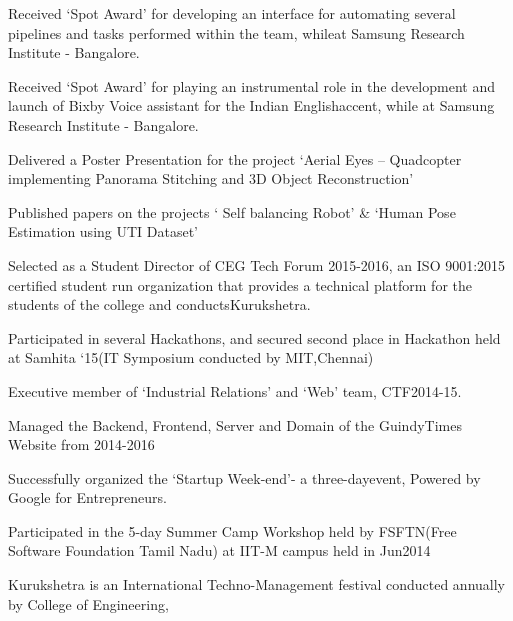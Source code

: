 
\begin{cventries}
      \begin{cvitems} %
        \item{Received ‘Spot Award’ for developing an interface for automating several pipelines and tasks performed within​ the​ team,​ while​ at​ Samsung​ Research​ Institute​ - Bangalore.}
        \item{Received ‘Spot Award’ for playing an instrumental role in the development and launch of Bixby Voice assistant​ for​ the​ Indian​ English​ accent,​ while​ at​ Samsung​ Research​ Institute​ - Bangalore.}
        \item{Delivered a Poster Presentation for the project ‘Aerial Eyes – Quadcopter implementing Panorama Stitching and 3D Object Reconstruction’}
        \item{Published​ papers​ on​ the​ projects​ ‘ Self balancing Robot’ \& ‘Human Pose Estimation using UTI Dataset’}
        \item{Selected as a Student Director of CEG Tech Forum 2015-2016, an ISO 9001:2015 certified student run organization​ that​ provides​ a technical​ platform​ for​ the​ students​ of​ the​ college​ and​ conducts​ Kurukshetra.}
        \item{Participated in several Hackathons, and secured second place in Hackathon held at Samhita ‘15(IT Symposium conducted​ by​ MIT,​ Chennai)}
        \item{Executive​ member​ of​ ‘Industrial​ Relations’​ and​ ‘Web’​ team,​ CTF​ 2014-15.}
        \item{Managed​ the​ Backend,​ Frontend,​ Server​ and​ Domain​ of​ the​ Guindy​ Times​ Website​ from​ 2014-2016}
        \item{Successfully​ organized​ the​ ‘Startup​ Week-end’-​ a three-day​ event,​ Powered​ by​ Google​ for​ Entrepreneurs.}
        \item{Participated in the 5-day Summer Camp Workshop held by FSFTN(Free Software Foundation Tamil Nadu) at IIT-M​ campus​ held​ in​ Jun​ 2014}
        \item{Kurukshetra is an International Techno-Management festival conducted annually by College of Engineering,}

\end{cvitems}
\end{cventries}
